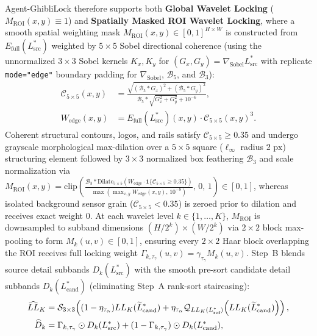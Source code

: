 \documentclass[conference,10pt]{IEEEtran}
\begin{document}
Agent-GhibliLock therefore supports both \textbf{Global Wavelet Locking} ($M_{\text{ROI}}(x,y) \equiv 1$) and \textbf{Spatially Masked ROI Wavelet Locking}, where a smooth spatial weighting mask $M_{\text{ROI}}(x,y) \in [0, 1]^{H \times W}$ is constructed from $E_{\text{full}}(L^*_{\text{src}})$ weighted by $5\times 5$ Sobel directional coherence (using the unnormalized $3\times 3$ Sobel kernels $K_x, K_y$ for $(G_x, G_y) = \nabla_{\text{Sobel}} L^*_{\text{src}}$ with replicate \texttt{mode="edge"} boundary padding for $\nabla_{\text{Sobel}}$, $\mathcal{B}_5$, and $\mathcal{B}_3$):
\begin{equation}
\label{eq:roi_coherence}
\begin{aligned}
\mathcal{C}_{5\times 5}(x,y) &= \frac{\sqrt{(\mathcal{B}_5 * G_x)^2 + (\mathcal{B}_5 * G_y)^2}}{\mathcal{B}_5 * \sqrt{G_x^2 + G_y^2} + 10^{-6}}, \\
W_{\text{edge}}(x,y) &= E_{\text{full}}(L^*_{\text{src}})(x,y) \cdot \mathcal{C}_{5\times 5}(x,y)^3.
\end{aligned}
\end{equation}
Coherent structural contours, logos, and rails satisfy $\mathcal{C}_{5\times 5} \ge 0.35$ and undergo grayscale morphological max-dilation over a $5\times 5$ square ($\ell_\infty$ radius $2\text{ px}$) structuring element followed by $3\times 3$ normalized box feathering $\mathcal{B}_3$ and scale normalization via $M_{\text{ROI}}(x,y) = \mathrm{clip}\!\left(\frac{\mathcal{B}_3 * \mathrm{Dilate}_{5\times 5}(W_{\text{edge}} \cdot \mathbf{1}\{\mathcal{C}_{5\times 5} \ge 0.35\})}{\max(\max_{x,y} W_{\text{edge}}(x,y),\, 10^{-8})},\, 0,\, 1\right) \in [0, 1]$, whereas isolated background sensor grain ($\mathcal{C}_{5\times 5} < 0.35$) is zeroed prior to dilation and receives exact weight $0$. At each wavelet level $k \in \{1, \dots, K\}$, $M_{\text{ROI}}$ is downsampled to subband dimensions $(H/2^k) \times (W/2^k)$ via $2\times 2$ block max-pooling to form $M_k(u,v) \in [0, 1]$, ensuring every $2\times 2$ Haar block overlapping the ROI receives full locking weight $\Gamma_{k,\tau_\gamma}(u,v) = \gamma_{\tau_\gamma} M_k(u,v)$. Step~B blends source detail subbands $D_k(L^*_{\text{src}})$ with the smooth pre-sort candidate detail subbands $D_k(L^*_{\text{cand}})$ (eliminating Step~A rank-sort staircasing):
\begin{equation}
\label{eq:step_b_fusion}
\resizebox{0.89\columnwidth}{!}{$\displaystyle
\begin{aligned}
\widehat{LL}_K &= \mathcal{S}_{3\times 3}\!\left((1 - \eta_{\tau_\alpha}) LL_K(\widetilde{L}^*_{\text{cand}}) + \eta_{\tau_\alpha} \mathcal{Q}_{LL_K(L^*_{\text{ref}})}\!\left(LL_K(\widetilde{L}^*_{\text{cand}})\right)\right), \\
\widehat{D}_k &= \Gamma_{k,\tau_\gamma} \odot D_k(L^*_{\text{src}}) + (1 - \Gamma_{k,\tau_\gamma}) \odot D_k(L^*_{\text{cand}}),
\end{aligned}
$}
\end{equation}
\end{document}
